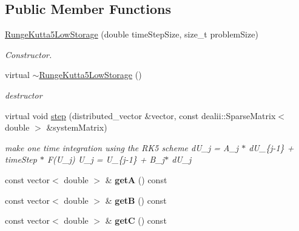 \subsection*{Public Member Functions}
\begin{DoxyCompactItemize}
\item 
\hyperlink{classnatrium_1_1RungeKutta5LowStorage_a89468c83ced040a6373ddd05551e71d5}{Runge\-Kutta5\-Low\-Storage} (double time\-Step\-Size, size\-\_\-t problem\-Size)
\begin{DoxyCompactList}\small\item\em Constructor. \end{DoxyCompactList}\item 
\hypertarget{classnatrium_1_1RungeKutta5LowStorage_a0d0e4591d2b671f450029bb3ba3053de}{virtual \hyperlink{classnatrium_1_1RungeKutta5LowStorage_a0d0e4591d2b671f450029bb3ba3053de}{$\sim$\-Runge\-Kutta5\-Low\-Storage} ()}\label{classnatrium_1_1RungeKutta5LowStorage_a0d0e4591d2b671f450029bb3ba3053de}

\begin{DoxyCompactList}\small\item\em destructor \end{DoxyCompactList}\item 
\hypertarget{classnatrium_1_1RungeKutta5LowStorage_a91bc0f0c6eea11cb7c08f2572ba67408}{virtual void \hyperlink{classnatrium_1_1RungeKutta5LowStorage_a91bc0f0c6eea11cb7c08f2572ba67408}{step} (distributed\-\_\-vector \&vector, const dealii\-::\-Sparse\-Matrix$<$ double $>$ \&system\-Matrix)}\label{classnatrium_1_1RungeKutta5LowStorage_a91bc0f0c6eea11cb7c08f2572ba67408}

\begin{DoxyCompactList}\small\item\em make one time integration using the R\-K5 scheme d\-U\-\_\-j = A\-\_\-j $\ast$ d\-U\-\_\-\{j-\/1\} + time\-Step $\ast$ F(\-U\-\_\-j) U\-\_\-j = U\-\_\-\{j-\/1\} + B\-\_\-j$\ast$ d\-U\-\_\-j \end{DoxyCompactList}\item 
\hypertarget{classnatrium_1_1RungeKutta5LowStorage_af8368ba6fbaaef108e8a556da293c2b7}{const vector$<$ double $>$ \& {\bfseries get\-A} () const }\label{classnatrium_1_1RungeKutta5LowStorage_af8368ba6fbaaef108e8a556da293c2b7}

\item 
\hypertarget{classnatrium_1_1RungeKutta5LowStorage_a5045dc1bcf3df568f1574e12528b6d34}{const vector$<$ double $>$ \& {\bfseries get\-B} () const }\label{classnatrium_1_1RungeKutta5LowStorage_a5045dc1bcf3df568f1574e12528b6d34}

\item 
\hypertarget{classnatrium_1_1RungeKutta5LowStorage_a1097baed3c0e00ee258812a71226f998}{const vector$<$ double $>$ \& {\bfseries get\-C} () const }\label{classnatrium_1_1RungeKutta5LowStorage_a1097baed3c0e00ee258812a71226f998}

\end{DoxyCompactItemize}


